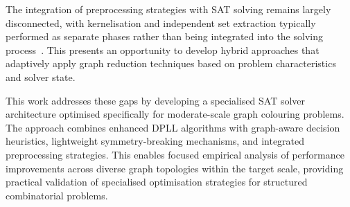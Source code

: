 The integration of preprocessing strategies with SAT solving remains largely disconnected, with kernelisation and independent set extraction typically performed as separate phases rather than being integrated into the solving process~\cite{lin2012coloring,jansen2013data}. This presents an opportunity to develop hybrid approaches that adaptively apply graph reduction techniques based on problem characteristics and solver state.

This work addresses these gaps by developing a specialised SAT solver architecture optimised specifically for moderate-scale graph colouring problems. The approach combines enhanced DPLL algorithms with graph-aware decision heuristics, lightweight symmetry-breaking mechanisms, and integrated preprocessing strategies. This enables focused empirical analysis of performance improvements across diverse graph topologies within the target scale, providing practical validation of specialised optimisation strategies for structured combinatorial problems.
